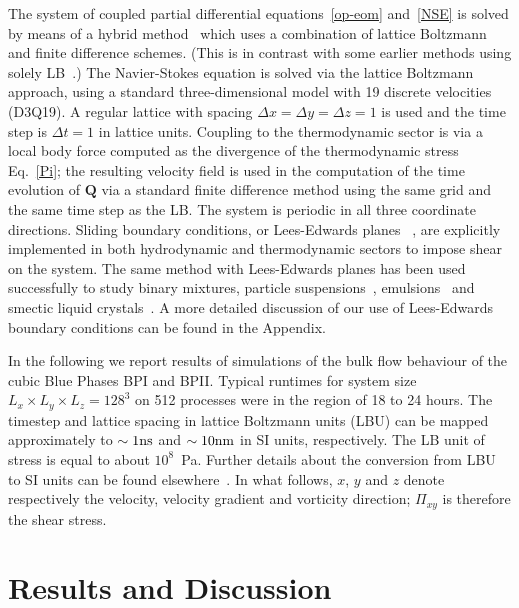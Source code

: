 \documentclass[8.5pt,twoside,twocolumn]{article}
\begin{document}
The system of coupled partial differential equations~\ref{op-eom}
and~\ref{NSE} is solved by means of a hybrid method~\cite{Marenduzzo:2007}
which uses a combination of lattice Boltzmann and finite difference schemes.
(This is in contrast with some earlier methods using solely
LB~\cite{Denniston:2001, Denniston:2004}.)
The Navier-Stokes
equation is solved via the lattice Boltzmann approach, using a standard
three-dimensional model with 19 discrete velocities (D3Q19).
A regular lattice with spacing $\Delta x = \Delta y = \Delta z = 1$ is
used and the time step is $\Delta t = 1$ in lattice units.
Coupling to the thermodynamic sector is via a
local body force computed as the divergence of the thermodynamic
stress Eq.~\ref{Pi}; the resulting velocity field is used in the computation
of the time evolution of $\mathbf{Q}$ via a standard finite difference
method using the same grid and the same time step as the LB. The system
is periodic in all three coordinate directions. Sliding
boundary conditions, or Lees-Edwards planes ~\cite{Wagner:2002}, are explicitly implemented
in both hydrodynamic and thermodynamic sectors to impose shear on the
system. 
The same method with Lees-Edwards planes
has been used successfully to study binary mixtures, particle suspensions~\cite{MacMeccan:2009, Aidun:2010}, 
emulsions~\cite{Frijters:2012} and smectic liquid crystals~\cite{Henrich:2012a}.
A more detailed discussion of our use of Lees-Edwards boundary conditions can be found in the Appendix.

In the following we report results of simulations of the bulk flow behaviour of the cubic Blue 
Phases BPI and BPII.
Typical runtimes for system size $L_x\times L_y\times L_z=128^3$ on 512 processes were in the region of 18 to 24 hours.  
The timestep and lattice spacing in lattice Boltzmann units (LBU) can be mapped
approximately to $\sim 1 {\rm ns}$ and $\sim 10{\rm nm}$ in SI units, respectively. The LB unit of stress
is equal to about $10^8$~Pa. Further details about the conversion 
from LBU to SI units can be found elsewhere~\cite{Henrich:2011a,Henrich:2010b}.
In what follows, $x$, $y$ and $z$ denote respectively the velocity, velocity
gradient and vorticity direction; $\Pi_{xy}$ is therefore the shear stress.

\section{Results and Discussion}
\end{document}
